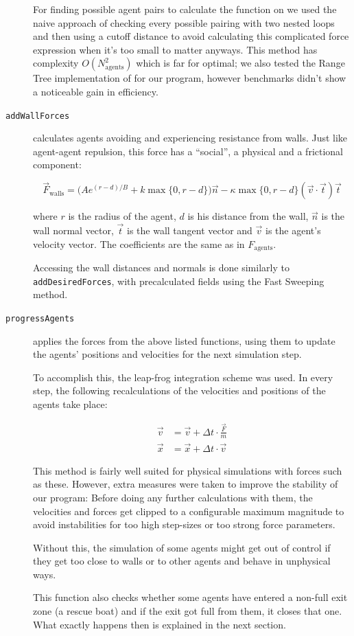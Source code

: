 \documentclass[11pt]{article}
\begin{document}
\begin{description}
For finding possible agent pairs to calculate the function on we used the naive
approach of checking every possible pairing with two nested loops and then
using a cutoff distance to avoid calculating this complicated force expression
when it's too small to matter anyways.  This method has complexity
$O(N_\text{agents}^2)$ which is far for optimal; we also tested the Range Tree
implementation of \cite{multilevel} for our program, however benchmarks didn't
show a noticeable gain in efficiency.

\item[\texttt{addWallForces}] calculates agents avoiding and experiencing
resistance from walls.  Just like agent-agent repulsion, this force has a
``social'', a physical and a frictional component:

\[ \vec{F}_\text{walls} = \big(A e^{(r-d)/B} + k \max\{0, r-d\}\big) \vec{n} -
                    \kappa \max\{0, r-d\} (\vec{v} \cdot \vec{t}) \vec{t} \]

where $r$ is the radius of the agent, $d$ is his distance from the wall,
$\vec{n}$ is the wall normal vector, $\vec{t}$ is the wall tangent vector and
$\vec{v}$ is the agent's velocity vector.  The coefficients are the same as in
$F_\text{agents}$.

Accessing the wall distances and normals is done similarly to
\texttt{addDesiredForces}, with precalculated fields using the Fast Sweeping
method.

\item[\texttt{progressAgents}] applies the forces from the above listed
functions, using them to update the agents' positions and velocities for the
next simulation step.

To accomplish this, the leap-frog integration scheme was used.  In every step,
the following recalculations of the velocities and positions of the agents take
place:

\begin{align*}
\vec{v} &= \vec{v} + \Delta t \cdot \frac{\vec{F}}{m}  \\
\vec{x} &= \vec{x} + \Delta t \cdot \vec{v}
\end{align*}

This method is fairly well suited for physical simulations with forces such as
these.  However, extra measures were taken to improve the stability of our
program:  Before doing any further calculations with them, the velocities and
forces get clipped to a configurable maximum magnitude to avoid instabilities
for too high step-sizes or too strong force parameters.

Without this, the simulation of some agents might get out of control if they
get too close to walls or to other agents and behave in unphysical ways.

This function also checks whether some agents have entered a non-full exit zone
(a rescue boat) and if the exit got full from them, it closes that one.  What
exactly happens then is explained in the next section.

\end{description}
\end{document}
